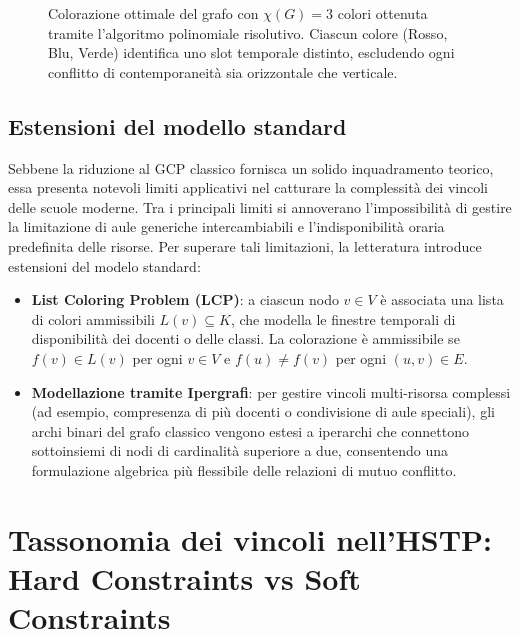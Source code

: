 \begin{figure}[htbp]
    \caption{Colorazione ottimale del grafo con $\chi(G) = 3$ colori ottenuta tramite l'algoritmo polinomiale risolutivo. Ciascun colore (Rosso, Blu, Verde) identifica uno slot temporale distinto, escludendo ogni conflitto di contemporaneità sia orizzontale che verticale.}
    \label{fig:triennio-colorato}
\end{figure}
\newpage
\subsection*{Estensioni del modello standard}
\label{subsec:estensioni-modello}

Sebbene la riduzione al GCP classico fornisca un solido inquadramento teorico,
essa presenta notevoli limiti applicativi nel catturare la complessità dei
vincoli delle scuole moderne. Tra i principali limiti si annoverano
l'impossibilità di gestire la limitazione di aule generiche intercambiabili e
l'indisponibilità oraria predefinita delle risorse. Per superare tali
limitazioni, la letteratura introduce estensioni del modelo standard:
\begin{itemize}
    \item \textbf{List Coloring Problem (LCP)}: a ciascun nodo $v \in V$ è
    associata una lista di colori ammissibili $L(v) \subseteq K$, che modella le
    finestre temporali di disponibilità dei docenti o delle classi. La
    colorazione è ammissibile se $f(v) \in L(v)$ per ogni $v \in V$ e $f(u) \neq
    f(v)$ per ogni $(u,v) \in E$.
    \item \textbf{Modellazione tramite Ipergrafi}: per gestire vincoli
    multi-risorsa complessi (ad esempio, compresenza di più docenti o
    condivisione di aule speciali), gli archi binari del grafo classico vengono
    estesi a iperarchi che connettono sottoinsiemi di nodi di cardinalità
    superiore a due, consentendo una formulazione algebrica più flessibile delle
    relazioni di mutuo conflitto.
\end{itemize}
\newpage
\section{Tassonomia dei vincoli nell'HSTP: Hard Constraints vs Soft Constraints}
\label{sec:tassonomia-vincoli}


